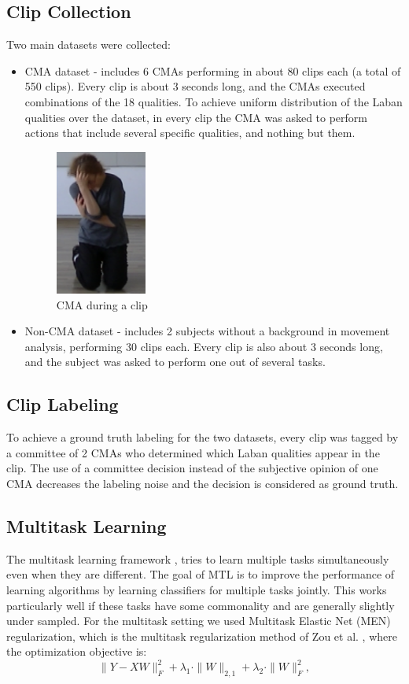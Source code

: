 \documentclass[11pt,twocolumn,varwidth=true,a4paper,fleqn]{article}
\begin{document}
\subsection{Clip Collection}
Two main datasets were collected:
\begin{itemize}
  \item
  CMA dataset - includes 6 CMAs performing in about
  80 clips each (a total of 550 clips). Every clip is about 3 seconds long, and the CMAs executed combinations of the 18 qualities.
  To achieve uniform distribution of the Laban qualities over the dataset, in every
  clip the CMA was asked to perform actions that include several specific qualities,
  and nothing but them.
  
  \begin{figure}[h]
\centering
\includegraphics[width=30mm]{Rachelle.png}
\caption{CMA during a clip}
\label{Rachelle}
\end{figure}

\item
Non-CMA dataset - includes 2 subjects without a background in movement
analysis, performing 30 clips each. Every clip is also about 3 seconds long,
and the subject was asked to perform one out of several
tasks.
\end{itemize}
\subsection{Clip Labeling}
To achieve a ground truth labeling for the two datasets, every clip was tagged by
a committee of 2 CMAs who determined which Laban qualities appear in the
clip. The use of a committee decision instead of the subjective opinion of one
CMA decreases the labeling noise and the decision is considered as ground truth.

\subsection{Multitask Learning}
The multitask learning framework \cite{caruana1997multitask},  tries to learn multiple tasks simultaneously even
when they are different. The goal of MTL is to improve the performance of learning algorithms by learning
classifiers for multiple tasks jointly. This works particularly well if these tasks have some commonality and
are generally slightly under sampled.
For the multitask setting we used Multitask Elastic Net (MEN) regularization, which is
the multitask regularization method of Zou et al. \cite{Zou}, where the
optimization objective is:
\\
\begin{equation}\label{eq:MEN}
\|Y - XW\|^2_F+\lambda_1\cdot\|W\|_{2,1}+\lambda_2\cdot\|W\|^2_F,
\end{equation}
\end{document}
